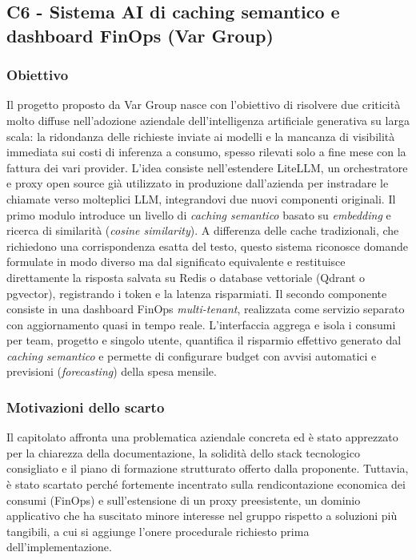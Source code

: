 \documentclass[11pt, a4paper]{article}
\begin{document}
\subsection{C6 - Sistema AI di caching semantico e dashboard FinOps (Var Group)}
\subsubsection{Obiettivo}
Il progetto proposto da Var Group nasce con l'obiettivo di risolvere due criticità molto diffuse nell'adozione aziendale dell'intelligenza artificiale generativa su larga scala: la ridondanza delle richieste inviate ai modelli e la mancanza di visibilità immediata sui costi di inferenza a consumo, spesso rilevati solo a fine mese con la fattura dei vari provider. \newline
L'idea consiste nell'estendere LiteLLM, un orchestratore e proxy open source già utilizzato in produzione dall'azienda per instradare le chiamate verso molteplici LLM, integrandovi due nuovi componenti originali. \newline
Il primo modulo introduce un livello di \textit{caching semantico} basato su \textit{embedding} e ricerca di similarità (\textit{cosine similarity}). A differenza delle cache tradizionali, che richiedono una corrispondenza esatta del testo, questo sistema riconosce domande formulate in modo diverso ma dal significato equivalente e restituisce direttamente la risposta salvata su Redis o database vettoriale (Qdrant o pgvector), registrando i token e la latenza risparmiati. \newline
Il secondo componente consiste in una dashboard FinOps \textit{multi-tenant}, realizzata come servizio separato con aggiornamento quasi in tempo reale. L'interfaccia aggrega e isola i consumi per team, progetto e singolo utente, quantifica il risparmio effettivo generato dal \textit{caching semantico} e permette di configurare budget con avvisi automatici e previsioni (\textit{forecasting}) della spesa mensile.

\subsubsection{Motivazioni dello scarto}
Il capitolato affronta una problematica aziendale concreta ed è stato apprezzato per la chiarezza della documentazione, la solidità dello stack tecnologico consigliato e il piano di formazione strutturato offerto dalla proponente. \newline
Tuttavia, è stato scartato perché fortemente incentrato sulla rendicontazione economica dei consumi (FinOps) e sull'estensione di un proxy preesistente, un dominio applicativo che ha suscitato minore interesse nel gruppo rispetto a soluzioni più tangibili, a cui si aggiunge l'onere procedurale richiesto prima dell'implementazione.
\end{document}

